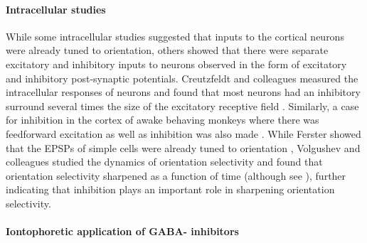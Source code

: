 \paragraph{Intracellular studies}

While some intracellular studies suggested that inputs to the cortical neurons were already tuned to orientation, others showed that there were separate excitatory and inhibitory inputs to neurons observed in the form of excitatory and inhibitory post-synaptic potentials. Creutzfeldt and colleagues measured the intracellular responses of neurons and found that most neurons had an inhibitory surround several times the size of the excitatory receptive field \cite{Creutzfeldt1974}. Similarly, a case for inhibition in the cortex of awake behaving monkeys where there was feedforward excitation as well as inhibition was also made \cite{Celebrini1993}. While Ferster showed that the EPSPs of simple cells were already tuned to orientation \cite{Ferster1986}, Volgushev and colleagues studied the dynamics of orientation selectivity and found that orientation selectivity sharpened as a function of time \cite{Volgushev1995} (although see \cite{Celebrini1993}), further indicating that inhibition plays an important role in sharpening orientation selectivity.


\paragraph{Iontophoretic application of GABA- inhibitors}

